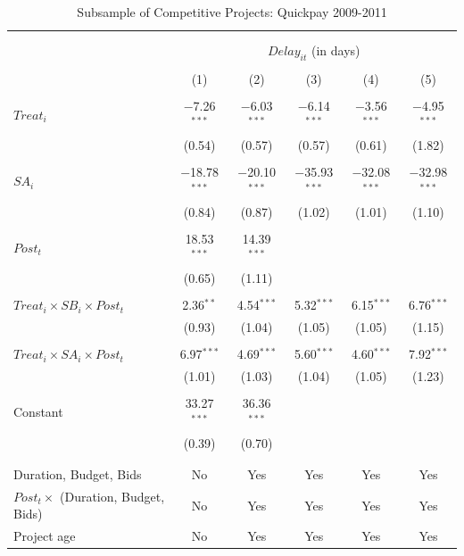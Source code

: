\documentclass[
]{article}
\begin{document}
\begin{table}[H] \centering 
  \caption{Subsample of Competitive Projects: Quickpay 2009-2011} 
  \label{} 
\small 
\begin{tabular}{@{\extracolsep{-2pt}}lccccc} 
\\[-1.8ex]\hline 
\hline \\[-1.8ex] 
\\[-1.8ex] & \multicolumn{5}{c}{$Delay_{it}$ (in days)} \\ 
\\[-1.8ex] & (1) & (2) & (3) & (4) & (5)\\ 
\hline \\[-1.8ex] 
 $Treat_i$ & $-$7.26$^{***}$ & $-$6.03$^{***}$ & $-$6.14$^{***}$ & $-$3.56$^{***}$ & $-$4.95$^{***}$ \\ 
  & (0.54) & (0.57) & (0.57) & (0.61) & (1.82) \\ 
  & & & & & \\ 
 $SA_i$ & $-$18.78$^{***}$ & $-$20.10$^{***}$ & $-$35.93$^{***}$ & $-$32.08$^{***}$ & $-$32.98$^{***}$ \\ 
  & (0.84) & (0.87) & (1.02) & (1.01) & (1.10) \\ 
  & & & & & \\ 
 $Post_t$ & 18.53$^{***}$ & 14.39$^{***}$ &  &  &  \\ 
  & (0.65) & (1.11) &  &  &  \\ 
  & & & & & \\ 
 $Treat_i \times SB_i \times Post_t$ & 2.36$^{**}$ & 4.54$^{***}$ & 5.32$^{***}$ & 6.15$^{***}$ & 6.76$^{***}$ \\ 
  & (0.93) & (1.04) & (1.05) & (1.05) & (1.15) \\ 
  & & & & & \\ 
 $Treat_i \times SA_i \times Post_t$ & 6.97$^{***}$ & 4.69$^{***}$ & 5.60$^{***}$ & 4.60$^{***}$ & 7.92$^{***}$ \\ 
  & (1.01) & (1.03) & (1.04) & (1.05) & (1.23) \\ 
  & & & & & \\ 
 Constant & 33.27$^{***}$ & 36.36$^{***}$ &  &  &  \\ 
  & (0.39) & (0.70) &  &  &  \\ 
  & & & & & \\ 
\hline \\[-1.8ex] 
Duration, Budget, Bids & No & Yes & Yes & Yes & Yes \\ 
$Post_t \times $  (Duration, Budget, Bids) & No & Yes & Yes & Yes & Yes \\ 
Project age & No & Yes & Yes & Yes & Yes \\ 

\end{tabular}
\end{table}
\end{document}
